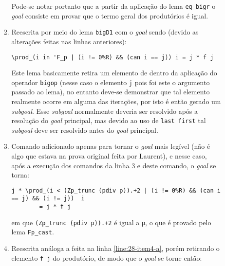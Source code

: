 \begin{enumerate}[label=\textbf{\roman*.}]
\begin{enumerate}[label=\textbf{\roman{enumi}.(\alph*)}]
\begin{enumerate}[listparindent=\parindent]
                        Pode-se notar portanto que a partir da aplicação do lema \lstinline[language=coq]|eq_bigr| o \textit{goal} consiste em provar que o termo geral dos produtórios é igual.
                        
                        \item[\textbf{(\ref{line:28-item4-a})}] Reescrita por meio do lema \lstinline[language=coq]|bigD1| com o \textit{goal} sendo (devido as alterações feitas nas linhas anteriores):
                        
                                \begin{lstlisting}[language=coq,frame=single,tabsize=1]
\prod_(i in 'F_p | (i != 0%R) && (can i == j)) i = j * f j
                                \end{lstlisting}
                        Este lema basicamente retira um elemento de dentro da aplicação do operador \lstinline[language=coq]|bigop| (nesse caso o elemento \lstinline[language=coq]|j| pois foi este o argumento passado ao lema), no entanto deve-se demonstrar que tal elemento realmente ocorre em alguma das iterações, por isto é então gerado um \textit{subgoal}. Esse \textit{subgoal} normalmente deveria ser resolvido após a resolução do \textit{goal} principal, mas devido ao uso de \lstinline[language=coq]|last first| tal \textit{subgoal} deve ser resolvido antes do \textit{goal} principal.
                        
                        \item[\textbf{(\ref{line:30-item4-a})}] Comando adicionado apenas para tornar o \textit{goal} mais legível (não é algo que estava na prova original feita por Laurent), e nesse caso, após a execução dos comandos da linha 3 e deste comando, o \textit{goal} se torna:
                        
                                \begin{lstlisting}[language=coq,frame=single,tabsize=1]
j * \prod_(i < (Zp_trunc (pdiv p)).+2 | (i != 0%R) && (can i == j) && (i != j))  i 
        = j * f j
                                \end{lstlisting}
                        em que \lstinline[language=coq]|(Zp_trunc (pdiv p)).+2| é igual a \lstinline[language=coq]|p|, o que é provado pelo lema \lstinline[language=coq]|Fp_cast|.
                        
                        \item[\textbf{(\ref{line:31-item4-a})}] Reescrita análoga a feita na linha \ref{line:28-item4-a}, porém retirando o elemento \lstinline[language=coq]|f j| do produtório, de modo que o \textit{goal} se torne então:
                        

\end{enumerate}
\end{enumerate}
\end{enumerate}
